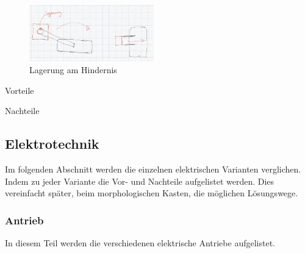\paragraph{}
\begin{figure}
        \centering
        \includegraphics[width=0.48\textwidth]{img/technologierecherche/Rotation/ueberkopf_objekt_gelagert.jpg}
        \caption{Lagerung am Hindernis } 
        \label{img:tech_ueberkopf_objekt_gelagert}
\end{figure}
\begin{minipage}[t]{0.48\textwidth}
    \begin{items}
          \item [Vorteile]
          \item 
          \item 
    \end{items}
\end{minipage}
\hfill
\begin{minipage}[t]{0.48\textwidth}
    \begin{items}
          \item [Nachteile]
          \item 
          \item
          \item 
          \item 
    \end{items}
\end{minipage}



\newpage
\subsection{Elektrotechnik}
Im folgenden Abschnitt werden die einzelnen elektrischen Varianten verglichen. Indem zu jeder Variante die Vor- und Nachteile aufgelistet werden. Dies vereinfacht später, beim morphologischen Kasten, die möglichen Lösungswege.

\subsubsection{Antrieb}

In diesem Teil werden die verschiedenen elektrische Antriebe aufgelistet. 

